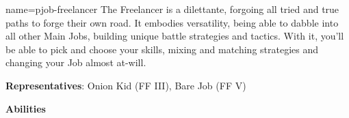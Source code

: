 \begin{jobdesc}{name=pjob-freelancer}
    The Freelancer is a dilettante, forgoing all tried and true paths to forge their own road. It embodies versatility, being able to dabble into all other Main Jobs, building unique battle strategies and tactics. With it, you’ll be able to pick and choose your skills, mixing and matching strategies and changing your Job almost at-will. \pc

    \textbf{Representatives}: Onion Kid (FF III), Bare Job (FF V) \pc

    \jobstats[hpa=3x,hpb=4x,hpc=5x,hpd=6x,mpa=1x,mpc=2x,armor=?,weapons=?]
\end{jobdesc}

\begin{ffminipage}
{\centering \textbf{Abilities}\par }


\end{ffminipage}

